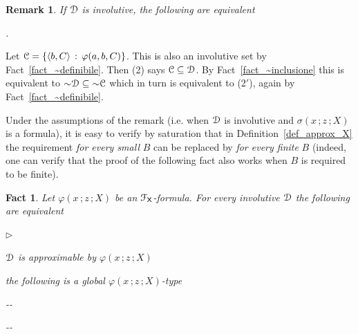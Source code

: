 \documentclass{amsproc}
\makeatletter
\newcommand{\mylabel}[1]{{#1}\hfill}
\renewenvironment{itemize}
  {\begin{list}{$\triangleright$}{%
  \setlength{\parskip}{0mm}
  \setlength{\topsep}{.1\baselineskip}
  \setlength{\rightmargin}{0mm}
  \setlength{\listparindent}{0mm}
  \setlength{\itemindent}{0mm}
  \setlength{\labelwidth}{3ex}
  \setlength{\itemsep}{.1\baselineskip}
  \setlength{\parsep}{.1\baselineskip}
  \setlength{\partopsep}{0mm}
  \setlength{\labelsep}{1ex}
  \setlength{\leftmargin}{\labelwidth+\labelsep}
  \let\makelabel\mylabel}}{%
\end{list}}
\newcounter{thm}
\theoremstyle{mio}
\newtheorem{fact}[thm]{Fact}\tcolorboxenvironment{fact}{mythm}
\newtheorem{remark}[thm]{Remark}\tcolorboxenvironment{remark}{mythm}
\providecommand{\proofNameStyle}{\bfseries}
\renewenvironment{proof}[1][\proofname]{\par
  \pushQED{\qed}%
  \normalfont%
  \trivlist
  \item[\hskip\labelsep
        \proofNameStyle
    #1\@addpunct{.}]\ignorespaces
}{%
  \popQED\endtrivlist\@endpefalse
}
\makeatother
\begin{document}
\begin{remark}\label{rem_approx}
  If ${\EuScript D}$ is involutive, the following are equivalent\smallskip

  \smallskip

  .
\end{remark}

\begin{proof}
  Let ${\EuScript C}=\{\langle b,C\rangle\,:\,\varphi(a,b,C)\}$.
  This is also an involutive set by Fact~\ref{fact_~definibile}.
  Then (2) says ${\EuScript C}\subseteq{\EuScript D}$.
  By Fact~\ref{fact_~inclusione} this is equivalent to ${\sim}{\EuScript D}\subseteq{\sim}{\EuScript C}$ which in turn is equivalent to (2$'$), again by Fact~\ref{fact_~definibile}.
\end{proof}

Under the assumptions of the remark (i.e. when ${\EuScript D}$ is involutive and $\sigma(x\,;z\,;X)$ is a formula), it is easy to verify by saturation that in Definition~\ref{def_approx_X} the requirement \textit{for every small\/} $B$ can be replaced by \textit{for every finite\/} $B$ (indeed, one can verify that the proof of the following fact also works when $B$ is required to be finite).

\begin{fact}\label{fact_approx_X}
  Let $\varphi(x\,;z\,;X)$ be an ${\EuScript F}_{\sf X}$-formula.
  For every involutive ${\EuScript D}$ the following are equivalent
  \begin{itemize}
    \item [1.] ${\EuScript D}$ is approximable by $\varphi(x\,;z\,;X)$
    \item [2.] the following is a global $\varphi(x\,;z\,;X)$-type\smallskip
    
    \noindent\kern-\kern-
    \smallskip

    \noindent\kern-\kern-
  
  \end{itemize}
\end{fact}
\end{document}
